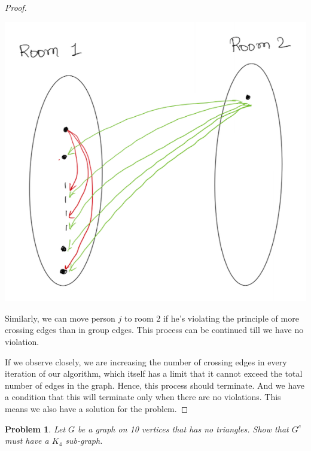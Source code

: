 \documentclass[12pt]{article}
\newtheorem{problem}{Problem}
\begin{document}
\begin{proof}
\begin{center}
\includegraphics[width=16cm, keepaspectratio]{2}
\end{center}

Similarly, we can move person $j$ to room 2 if he's violating the principle of more crossing edges than in group edges. This process can be continued till we have no violation.

If we observe closely, we are increasing the number of crossing edges in every iteration of our algorithm, which itself has a limit that it cannot exceed the total number of edges in the graph. Hence, this process should terminate. And we have a condition that this will terminate only when there are no violations. This means we also have a solution for the problem.

\end{proof}


\begin{problem}
Let $G$ be a graph on 10 vertices that has no triangles. Show that $G^{c}$ must have a $K_{4}$ sub-graph.
\end{problem}
\end{document}
